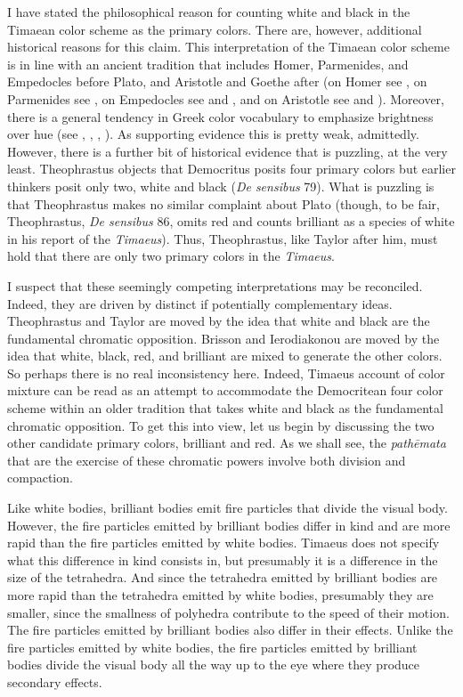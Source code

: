 I have stated the philosophical reason for counting white and black in the Timaean color scheme as the primary colors. There are, however, additional historical reasons for this claim. This interpretation of the Timaean color scheme is in line with an ancient tradition that includes Homer, Parmenides, and Empedocles before Plato, and Aristotle and Goethe after (on Homer see \citealt{Gladstone:1858fk}, on Parmenides see \citealt[chapter 5.3]{Kalderon:2015fr}, on Empedocles see \citealt{Ierodiakonou:2005fk} and \citealt[chapter 5.4]{Kalderon:2015fr}, and on Aristotle see \citealt{Sorabji:2022qf} and \citealt[chapter 6]{Kalderon:2015fr}). Moreover, there is a general tendency in Greek color vocabulary to emphasize brightness over hue (see \citealt{Gladstone:1858fk}, \citealt{Platnauer:1921bh}, \citealt{Osbourne:1968vn}, \citealt[chapter 1]{Lloyd:2007fk}). As supporting evidence this is pretty weak, admittedly. However, there is a further bit of historical evidence that is puzzling, at the very least. Theophrastus objects that Democritus posits four primary colors but earlier thinkers posit only two, white and black (\emph{De sensibus} 79). What is puzzling is that Theophrastus makes no similar complaint about Plato (though, to be fair, Theophrastus, \emph{De sensibus} 86, omits red and counts brilliant as a species of white in his report of the \emph{Timaeus}). Thus, Theophrastus, like Taylor after him, must hold that there are only two primary colors in the \emph{Timaeus}.

I suspect that these seemingly competing interpretations may be reconciled. Indeed, they are driven by distinct if potentially complementary ideas. Theophrastus and Taylor are moved by the idea that white and black are the fundamental chromatic opposition. Brisson and Ierodiakonou are moved by the idea that white, black, red, and brilliant are mixed to generate the other colors. So perhaps there is no real inconsistency here. Indeed, Timaeus account of color mixture can be read as an attempt to accommodate the Democritean four color scheme within an older tradition that takes white and black as the fundamental chromatic opposition. To get this into view, let us begin by discussing the two other candidate primary colors, brilliant and red. As we shall see, the \emph{pathēmata} that are the exercise of these chromatic powers involve both division and compaction.

Like white bodies, brilliant bodies emit fire particles that divide the visual body. However, the fire particles emitted by brilliant bodies differ in kind and are more rapid than the fire particles emitted by white bodies. Timaeus does not specify what this difference in kind consists in, but presumably it is a difference in the size of the tetrahedra. And since the tetrahedra emitted by brilliant bodies are more rapid than the tetrahedra emitted by white bodies, presumably they are smaller, since the smallness of polyhedra contribute to the speed of their motion. The fire particles emitted by brilliant bodies also differ in their effects. Unlike the fire particles emitted by white bodies, the fire particles emitted by brilliant bodies divide the visual body all the way up to the eye where they produce secondary effects.


